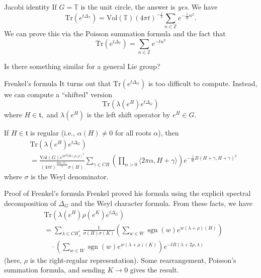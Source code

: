 \documentclass{beamer}
\numberwithin{equation}{section}
\theoremstyle{plain}
\theoremstyle{plain}
\theoremstyle{definition}
\theoremstyle{plain}
\theoremstyle{plain}
\theoremstyle{definition}
\newcommand{\Itgr}{\mathbb{Z}}
\newcommand{\Circ}{\mathbb{T}}
\newcommand{\Tr}{\mathrm{Tr}}
\newcommand{\sgn}{\operatorname{sgn}}
\newcommand{\tf}{\mathfrak{t}}
\begin{document}
\begin{frame}{Jacobi identity}
  If $G = \Circ$ is the unit circle, the answer is \emph{yes}. We have
  \[
    \Tr(e^{t\Delta_{\Circ}}) = \mathrm{Vol}(\Circ)(4\pi t)^{-\frac12}\sum_{n\in \Itgr} e^{-\frac{1}{4t}n^2}.
  \]
  We can prove this via the Poisson summation formula and the fact that
  \[
    \Tr(e^{t\Delta_{\Circ}}) = \sum_{n\in \Itgr} e^{-tn^2}
  \]
  
  Is there something similar for a general Lie group?
\end{frame}

\begin{frame}{Frenkel's formula}
  It turns out that $\Tr(e^{t\Delta_G})$ is too difficult to compute. Instead, we can compute a ``shifted" version
  \[
    \Tr(\lambda(e^H)e^{t\Delta_G})
  \]
  where $H\in \tf,$ and $\lambda(e^H)$ is the left shift operator by $e^H\in G.$
  \begin{theorem}
      If $H\in \tf$ is regular (i.e., $\alpha(H)\neq 0$ for all roots $\alpha$), then
      \begin{align*}
          &\Tr(\lambda(e^H)e^{t\Delta_G})\\
          &= \frac{\mathrm{Vol}(G)e^{4\pi^2tB(\rho,\rho)^2}}{(4\pi t)^{\frac{\mathrm{dim}(G)}{2}}\sigma(H)}\sum_{\gamma \in CR} \left(\prod_{\alpha>0} \langle 2\pi \alpha,H+\gamma\rangle\right) e^{-\frac{1}{4t}B(H+\gamma,H+\gamma)^2} 
      \end{align*}
      where $\sigma$ is the Weyl denominator.
  \end{theorem}
\end{frame}

\begin{frame}{Proof of Frenkel's formula}
    Frenkel proved his formula using the explicit spectral decomposition of $\Delta_G$ and the Weyl character formula. From these facts, we have
    \begin{align*}
      &\Tr(\lambda(e^H)\rho(e^K)e^{t\Delta_G})\\ 
      &= \sum_{\lambda \in CR^*_+} \frac{1}{\sigma(H)\sigma(K)}\left(\sum_{w \in W} \sgn(w)e^{w(\lambda+\rho)(H)}\right)\\
      &\quad \cdot \left(\sum_{w\in W} \sgn(w)e^{w(\lambda+\rho)(K)}\right)e^{-tB(\lambda+2\rho,\lambda)}
    \end{align*}
    (here, $\rho$ is the right-regular representation).
    Some rearrangement, Poisson's summation formula, and sending $K\to 0$ gives the result.
\end{frame}
\end{document}

